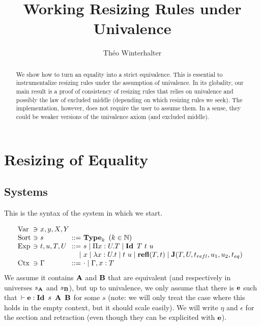 \documentclass[a4paper,english]{lipics-utf8x}
\title{Working Resizing Rules under Univalence}
\author[1]{Théo Winterhalter}
\begin{document}
  \maketitle

  \begin{abstract}
    We show how to turn an equality into a strict equivalence. This is essential
    to instrumentalize resizing rules under the assumption of univalence.
    In its globality, our main result is a proof of consistency of resizing
    rules that relies on univalence and possibly the law of excluded middle
    (depending on which resizing rules we seek). The implementation, however,
    does not require the user to assume them. In a sense, they could be weaker
    versions of the univalence axiom (and excluded middle).
  \end{abstract}

  \section{Resizing of Equality}

  \subsection{Systems}

  This is the syntax of the system in which we start.

  \[
    \begin{array}{l@{~}l@{~}l@{~}r@{~}l@{\quad}l}
      \Var  & \ni & x,y,X,Y \\
      \Sort & \ni & s             & ::= & \Type_k \mbox{ }
                                                (k \in \mathbb{N}) \\
      \Exp  & \ni & t,u,T,U & ::= & s \mid \Pi x:U.T \mid
                                    \Id T\ t\ u \\
                         &&& \mid & x \mid \lambda x:U.t \mid t~u
                               \mid \refl(T,t) \mid
                               \J (T,U,t_{refl},u_1,u_2,t_{eq}) \\
      \Ctx  & \ni & \Gamma  & ::= & \cdot \mid \Gamma, x:T \\
    \end{array}
  \]
  We assume it contains $\operatorname{\mathbf{A}}$ and $\operatorname{\mathbf{B}}$ that are equivalent (and respectively in
  universes $s_{\operatorname{\mathbf{A}}}$ and $s_{\operatorname{\mathbf{B}}}$), but up to univalence, we only assume that
  there is $\operatorname{\mathbf{e}}$ such that $\,\vdash \operatorname{\mathbf{e}} : \operatorname{\mathbf{Id}~} s\ \operatorname{\mathbf{A}}\ \operatorname{\mathbf{B}}$ for some $s$
  (note: we will only treat the case where this holds in the empty context,
  but it should scale easily).
  We will write $\eta$ and $\epsilon$ for the section and retraction (even
  though they can be explicited with $\operatorname{\mathbf{e}}$).
\end{document}
